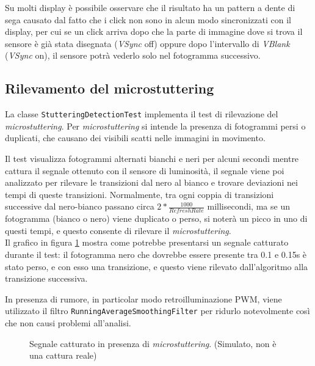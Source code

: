 Su molti display è possibile osservare che il risultato ha un pattern a dente di sega causato dal fatto che i click non sono in alcun modo sincronizzati con il display, per cui se un click arriva dopo che la parte di immagine dove si trova il sensore è già stata disegnata (\textit{VSync} off) oppure dopo l'intervallo di \textit{VBlank} (\textit{VSync} on), il sensore potrà vederlo solo nel fotogramma successivo.

\subsection{Rilevamento del microstuttering}
La classe \texttt{StutteringDetectionTest} implementa il test di rilevazione del \textit{microstuttering}. Per \textit{microstuttering} si intende la presenza di fotogrammi persi o duplicati, che causano dei visibili scatti nelle immagini in movimento.

Il test visualizza fotogrammi alternati bianchi e neri per alcuni secondi mentre cattura il segnale ottenuto con il sensore di luminosità, il segnale viene poi analizzato per rilevare le transizioni dal nero al bianco e trovare deviazioni nei tempi di queste transizioni. Normalmente, tra ogni coppia di transizioni successive dal nero-bianco passano circa ${2*\frac{1000}{RefreshRate}}$ millisecondi, ma se un fotogramma (bianco o nero) viene duplicato o perso, si noterà un picco in uno di questi tempi, e questo consente di rilevare il \textit{microstuttering}.\\
Il grafico in figura \ref{fig:stutteringDetectionTest_example} mostra come potrebbe presentarsi un segnale catturato durante il test: il fotogramma nero che dovrebbe essere presente tra 0.1 e 0.15s è stato perso, e con esso una transizione, e questo viene rilevato dall'algoritmo alla transizione successiva.

In presenza di rumore, in particolar modo retroilluminazione PWM, viene utilizzato il filtro \texttt{RunningAverageSmoothingFilter} per ridurlo notevolmente così che non causi problemi all'analisi.

\begin{figure}[H]
	\centering
	\caption{Segnale catturato in presenza di \textit{microstuttering}. (Simulato, non è una cattura reale)}
	\label{fig:stutteringDetectionTest_example}
\end{figure}

